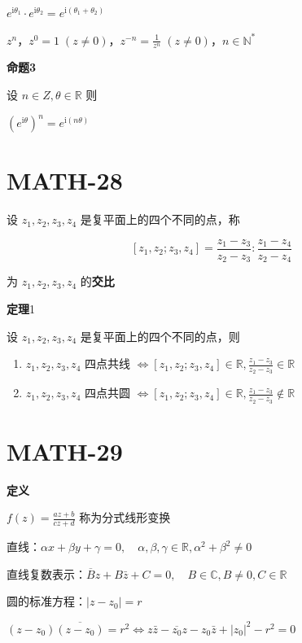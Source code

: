 \(e^{\mathrm{i}\theta_{1}}\cdot e^{\mathrm{i}\theta_{2}}=e^{\mathrm{i}(\theta_{1}+\theta_{2})}\)

\(z^{n}\)，\(z^{0}=1\;(z\neq 0)\)，\(z^{-n}=\frac{1}{z^{n}}\; (z \neq 0)\)，\(n\in \mathbb{N}^{*}\)

\textbf{命题3}

设 \(n\in Z, \theta \in \mathbb{R}\) 则

\(\left(e^{\mathrm{i}\theta}\right)^{n}=e^{\mathrm{i}(n\theta)}\)

\section{MATH-28}\label{math-28}

设 \(z_{1},z_{2},z_{3},z_{4}\) 是复平面上的四个不同的点，称

\[
[z_{1},z_{2};z_{3},z_{4}]= \frac{z_{1}-z_{3}}{z_{2}-z_{3}} : \frac{z_{1}-z_{4}}{z_{2}-z_{4}}
\]

为 \(z_{1}, z_{2},z_{3},z_{4}\) 的\textbf{交比}

\textbf{定理}1

设 \(z_{1},z_{2},z_{3},z_{4}\) 是复平面上的四个不同的点，则

\begin{enumerate}
\def\labelenumi{\arabic{enumi}.}
\tightlist
\item
  \(z_{1},z_{2},z_{3},z_{4}\) 四点共线
  \(\iff [z_{1},z_{2};z_{3},z_{4}] \in \mathbb{R}, \frac{z_{1}-z_{3}}{z_{2}-z_{3}} \in \mathbb{R}\)
\item
  \(z_{1},z_{2},z_{3},z_{4}\) 四点共圆
  \(\iff [z_{1},z_{2};z_{3},z_{4}]\in \mathbb{R}, \frac{z_{1}-z_{3}}{z_{2}-z_{3}} \not\in \mathbb{R}\)
\end{enumerate}

\section{MATH-29}\label{math-29}

\textbf{定义}

\(f(z)= \frac{az+b}{cz+d}\) 称为分式线形变换

直线：\(\alpha x+\beta y+\gamma=0, \quad \alpha, \beta,\gamma \in \mathbb{R}, \alpha^{2}+\beta^{2}\neq 0\)

直线复数表示：\(\overline{B} z+B\bar{z}+C=0, \quad B \in \mathbb{C}, B\neq 0, C\in \mathbb{R}\)

圆的标准方程：\(|z-z_{0}|=r\)

\((z-z_{0})\overline{(z-z_{0})}=r^{2} \iff z\bar{z}-\overline{z_{0}}z-z_{0}\bar{z}+|z_{0}|^{2}-r^{2}=0\)

